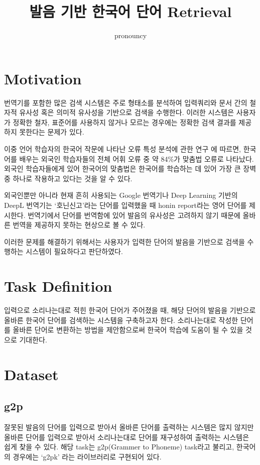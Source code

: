 \documentclass[11pt]{article}
\title{발음 기반 한국어 단어 Retrieval}
\author{pronouncy}
\date{}
\begin{document}
\maketitle
\tableofcontents

\section{Motivation}
번역기를 포함한 많은 검색 시스템은 주로 형태소를 분석하여 입력쿼리와 문서 간의 철자적 유사성 혹은 의미적 유사성을 기반으로 검색을 수행한다.
이러한 시스템은 사용자가 정확한 철자, 표준어를 사용하지 않거나 모르는 경우에는 정확한 검색 결과를 제공하지 못한다는 문제가 있다.

이중 언어 학습자의 한국어 작문에 나타난 오류 특성 분석에 관한 연구 \cite{__2012}에 따르면, 한국어를 배우는 외국인 학습자들의 전체 어휘 오류 중 약 84\%가 맞춤법 오류로 나타났다. 외국인 학습자들에게 있어 한국어의 맞춤법은 한국어를 학습하는 데 있어 가장 큰 장벽 중 하나로 작용하고 있다는 것을 알 수 있다.

외국인뿐만 아니라 현재 흔히 사용되는 Google 번역기나 Deep Learning 기반의 DeepL 번역기는 `호닌신고'라는 단어를 입력했을 때 honin report라는 영어 단어를 제시한다.
번역기에서 단어를 번역함에 있어 발음의 유사성은 고려하지 않기 때문에 올바른 번역을 제공하지 못하는 현상으로 볼 수 있다.

이러한 문제를 해결하기 위해서는 사용자가 입력한 단어의 발음을 기반으로 검색을 수행하는 시스템이 필요하다고 판단하였다.

\section{Task Definition}
입력으로 소리나는대로 적힌 한국어 단어가 주어졌을 때, 해당 단어의 발음을 기반으로 올바른 한국어 단어를 검색하는 시스템을 구축하고자 한다.
소리나는대로 작성한 단어를 올바른 단어로 변환하는 방법을 제안함으로써 한국어 학습에 도움이 될 수 있을 것으로 기대한다.

\section{Dataset}
\subsection{g2p}
잘못된 발음의 단어를 입력으로 받아서 올바른 단어를 출력하는 시스템은 많지 않지만 올바른 단어를 입력으로 받아서 소리나는대로 단어를 재구성하여 출력하는 시스템은 쉽게 찾을 수 있다.
해당 task는 g2p(Grammer to Phoneme) task라고 불리고, 한국어의 경우에는 `g2pk' \cite{park2019g2pk} 라는 라이브러리로 구현되어 있다.
\end{document}
